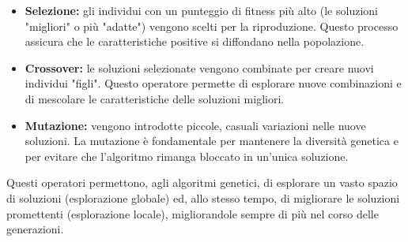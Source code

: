 \documentclass[a4paper,12pt]{report}
\begin{document}
	\begin{itemize}
		\item \textbf{Selezione:} gli individui con un punteggio di fitness più alto (le soluzioni "migliori" o più "adatte") vengono scelti per la riproduzione. Questo processo assicura che le caratteristiche positive si diffondano nella popolazione.
		\item \textbf{Crossover:} le soluzioni selezionate vengono combinate per creare nuovi individui "figli". Questo operatore permette di esplorare nuove combinazioni e di mescolare le caratteristiche delle soluzioni migliori.
		\item \textbf{Mutazione:} vengono introdotte piccole, casuali variazioni nelle nuove soluzioni. La mutazione è fondamentale per mantenere la diversità genetica e per evitare che l'algoritmo rimanga bloccato in un'unica soluzione.
	\end{itemize}
	Questi operatori permettono, agli algoritmi genetici, di esplorare un vasto spazio di soluzioni (esplorazione globale) ed, allo stesso tempo, di migliorare le soluzioni promettenti (esplorazione locale), migliorandole sempre di più nel corso delle generazioni.
	
\end{document}
